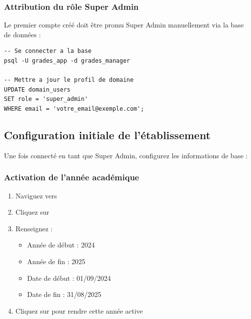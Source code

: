\subsubsection{Attribution du rôle Super Admin}

Le premier compte créé doit être promu Super Admin manuellement via la base de données :

\begin{lstlisting}[language={}, frame=single]
-- Se connecter a la base
psql -U grades_app -d grades_manager

-- Mettre a jour le profil de domaine
UPDATE domain_users
SET role = 'super_admin'
WHERE email = 'votre_email@exemple.com';
\end{lstlisting}


\subsection{Configuration initiale de l'établissement}

Une fois connecté en tant que Super Admin, configurez les informations de base :

\subsubsection{Activation de l'année académique}

\begin{enumerate}[leftmargin=*]
    \item Naviguez vers 
    \item Cliquez sur 
    \item Renseignez :
    \begin{itemize}
        \item Année de début : 2024
        \item Année de fin : 2025
        \item Date de début : 01/09/2024
        \item Date de fin : 31/08/2025
    \end{itemize}
    \item Cliquez sur  pour rendre cette année active
\end{enumerate}


